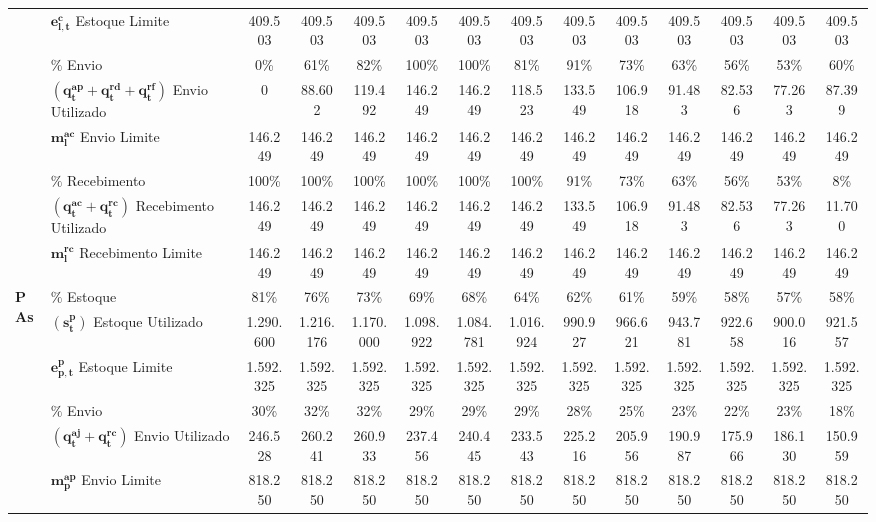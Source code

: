 \begin{table}
{\begin{tabular}{|l|l|c|c|c|c|c|c|c|c|c|c|c|c|}
& $\mathbf{e^{c}_{l,t}}$ Estoque Limite & 409.503 & 409.503 & 409.503 & 409.503 & 409.503 & 409.503 & 409.503 & 409.503 & 409.503 & 409.503 & 409.503 & 409.503 \\\cline{2-14}
& $\mathbf{\%}$ Envio & 0\% & 61\% & 82\% & 100\% & 100\% & 81\% & 91\% & 73\% & 63\% & 56\% & 53\% & 60\% \\\cline{2-14}
& $(\mathbf{q^{ap}_{t} + q^{rd}_{t} + q^{rf}_{t}})$ Envio Utilizado & 0 & 88.602 & 119.492 & 146.249 & 146.249 & 118.523 & 133.549 & 106.918 & 91.483 & 82.536 & 77.263 & 87.399 \\\cline{2-14}
& $\mathbf{m^{ac}_{l}}$ Envio Limite & 146.249 & 146.249 & 146.249 & 146.249 & 146.249 & 146.249 & 146.249 & 146.249 & 146.249 & 146.249 & 146.249 & 146.249 \\\cline{2-14}
& $\mathbf{\%}$ Recebimento & 100\% & 100\% & 100\% & 100\% & 100\% & 100\% & 91\% & 73\% & 63\% & 56\% & 53\% & 8\% \\\cline{2-14}
& $(\mathbf{q^{ac}_{t} + q^{rc}_{t}})$ Recebimento Utilizado & 146.249 & 146.249 & 146.249 & 146.249 & 146.249 & 146.249 & 133.549 & 106.918 & 91.483 & 82.536 & 77.263 & 11.700 \\\cline{2-14}
& $\mathbf{m^{rc}_{l}}$ Recebimento Limite & 146.249 & 146.249 & 146.249 & 146.249 & 146.249 & 146.249 & 146.249 & 146.249 & 146.249 & 146.249 & 146.249 & 146.249 \\
\hline
\multirow{9}{*}{\textbf{PAs}} & $\mathbf{\%}$ Estoque & 81\% & 76\% & 73\% & 69\% & 68\% & 64\% & 62\% & 61\% & 59\% & 58\% & 57\% & 58\% \\\cline{2-14}
& $(\mathbf{s^{p}_{t}})$ Estoque Utilizado & 1.290.600 & 1.216.176 & 1.170.000 & 1.098.922 & 1.084.781 & 1.016.924 & 990.927 & 966.621 & 943.781 & 922.658 & 900.016 & 921.557 \\\cline{2-14}
& $\mathbf{e^{p}_{p,t}}$ Estoque Limite & 1.592.325 & 1.592.325 & 1.592.325 & 1.592.325 & 1.592.325 & 1.592.325 & 1.592.325 & 1.592.325 & 1.592.325 & 1.592.325 & 1.592.325 & 1.592.325 \\\cline{2-14}
& $\mathbf{\%}$ Envio & 30\% & 32\% & 32\% & 29\% & 29\% & 29\% & 28\% & 25\% & 23\% & 22\% & 23\% & 18\% \\\cline{2-14}
& $(\mathbf{q^{aj}_{t} + q^{rc}_{t}})$ Envio Utilizado & 246.528 & 260.241 & 260.933 & 237.456 & 240.445 & 233.543 & 225.216 & 205.956 & 190.987 & 175.966 & 186.130 & 150.959 \\\cline{2-14}
& $\mathbf{m^{ap}_{p}}$ Envio Limite & 818.250 & 818.250 & 818.250 & 818.250 & 818.250 & 818.250 & 818.250 & 818.250 & 818.250 & 818.250 & 818.250 & 818.250 \\\cline{2-14}

\end{tabular}}
\end{table}
